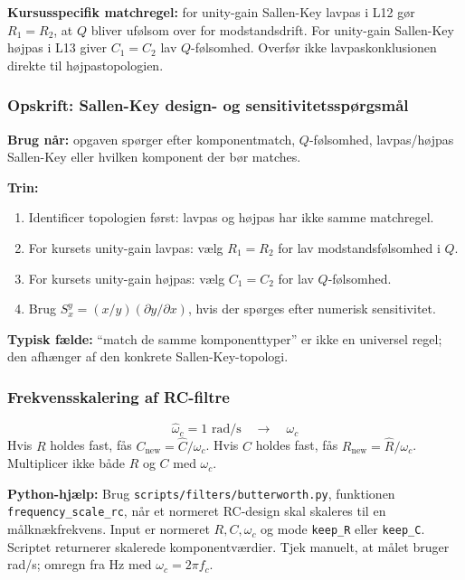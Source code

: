 \textbf{Kursusspecifik matchregel:} for unity-gain Sallen-Key lavpas i L12 gør \(R_1=R_2\), at \(Q\) bliver ufølsom over for modstandsdrift. For unity-gain Sallen-Key højpas i L13 giver \(C_1=C_2\) lav \(Q\)-følsomhed. Overfør ikke lavpaskonklusionen direkte til højpastopologien.

\subsubsection{Opskrift: Sallen-Key design- og sensitivitetsspørgsmål}
\textbf{Brug når:} opgaven spørger efter komponentmatch, \(Q\)-følsomhed, lavpas/højpas Sallen-Key eller hvilken komponent der bør matches.

\textbf{Trin:}
\begin{enumerate}
    \item Identificer topologien først: lavpas og højpas har ikke samme matchregel.
    \item For kursets unity-gain lavpas: vælg \(R_1=R_2\) for lav modstandsfølsomhed i \(Q\).
    \item For kursets unity-gain højpas: vælg \(C_1=C_2\) for lav \(Q\)-følsomhed.
    \item Brug \(S_x^y=(x/y)(\partial y/\partial x)\), hvis der spørges efter numerisk sensitivitet.
\end{enumerate}

\textbf{Typisk fælde:} ``match de samme komponenttyper'' er ikke en universel regel; den afhænger af den konkrete Sallen-Key-topologi.

\subsubsection{Frekvensskalering af RC-filtre}
\[
\hat\omega_c=1\text{ rad/s}\quad\to\quad \omega_c
\]
Hvis \(R\) holdes fast, fås \(C_{\mathrm{new}}=\hat C/\omega_c\). Hvis \(C\) holdes fast, fås \(R_{\mathrm{new}}=\hat R/\omega_c\). Multiplicer ikke både \(R\) og \(C\) med \(\omega_c\).

\textbf{Python-hjælp:} Brug \texttt{scripts/filters/butterworth.py}, funktionen \texttt{frequency\_scale\_rc}, når et normeret RC-design skal skaleres til en målknækfrekvens. Input er normeret \(R,C,\omega_c\) og mode \texttt{keep\_R} eller \texttt{keep\_C}. Scriptet returnerer skalerede komponentværdier. Tjek manuelt, at målet bruger rad/s; omregn fra Hz med \(\omega_c=2\pi f_c\).
